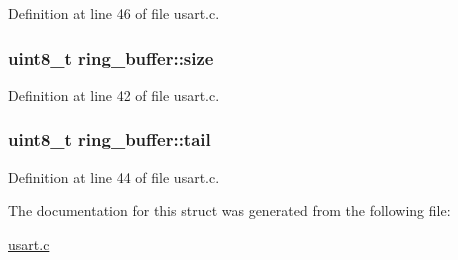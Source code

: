 Definition at line 46 of file usart.\-c.

\hypertarget{structring__buffer_afc24f89ba4a6c5783a381e2a10fcbedd}{
\subsubsection[{size}]{\setlength{\rightskip}{0pt plus 5cm}uint8\-\_\-t ring\-\_\-buffer\-::size}}\label{structring__buffer_afc24f89ba4a6c5783a381e2a10fcbedd}


Definition at line 42 of file usart.\-c.

\hypertarget{structring__buffer_ab0f9f0c2eae533546f76d08b39a71fc8}{
\subsubsection[{tail}]{\setlength{\rightskip}{0pt plus 5cm}uint8\-\_\-t ring\-\_\-buffer\-::tail}}\label{structring__buffer_ab0f9f0c2eae533546f76d08b39a71fc8}


Definition at line 44 of file usart.\-c.



The documentation for this struct was generated from the following file\-:\begin{DoxyCompactItemize}
\item 
\hyperlink{usart_8c}{usart.\-c}\end{DoxyCompactItemize}
